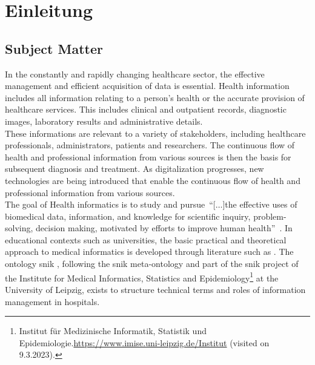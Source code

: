 \chapter{Einleitung}\label{ch:introduction}
\section{Subject Matter}
In the constantly and rapidly changing healthcare sector, the effective management and efficient acquisition of data is essential. 
Health information includes all information relating to a person's health or the accurate provision of healthcare services. This includes clinical and outpatient records, diagnostic images, laboratory results and administrative details.\\
%
These informations are relevant to a variety of stakeholders, including healthcare professionals, administrators, patients and researchers. 
The continuous flow of health and professional information from various sources is then the basis for subsequent diagnosis and treatment. 
As digitalization progresses, new technologies are being introduced that enable the continuous flow of health and professional information from various sources.\\
%
The goal of Health informatics is to study and pursue~\enquote{[$\dots$]the effective uses of biomedical data, information, and knowledge for scientific inquiry, problem-solving, decision making, motivated by efforts to improve human health}\ \citet{jen_informatics_2024}.
In educational contexts such as universities, the basic practical and theoretical approach to medical informatics is developed through literature such as \citet{bb2}. 
The ontology \ac{snik} \citep{semantischesnetz}, following the \ac{snik} meta-ontology and part of the \ac{snik} project of the Institute for Medical Informatics, Statistics and Epidemiology\footnote{\raggedright{}Institut für Medizinische Informatik, Statistik und Epidemiologie.\url{https://www.imise.uni-leipzig.de/Institut} (visited on 9.3.2023).} at the University of Leipzig, exists to structure technical terms and roles of information management in hospitals. 
